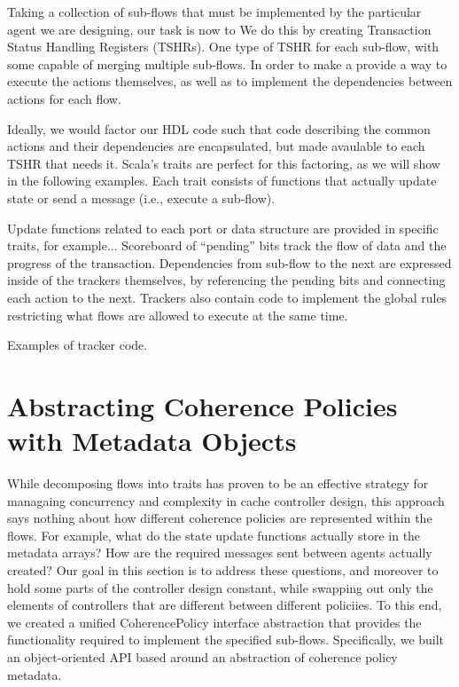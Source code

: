 Taking a collection of sub-flows that must be implemented by the particular agent we are designing,
our task is now to 
We do this by creating Transaction Status Handling Registers (TSHRs).
One type of TSHR for each sub-flow, with some capable of merging multiple sub-flows.
In order to make a
provide a way to execute the actions themselves, as well as to implement the dependencies between actions for each flow.

Ideally, we would factor our HDL code such that code describing the common actions and their dependencies are encapsulated,
but made avaulable to each TSHR that needs it.
Scala's traits are perfect for this factoring, as we will show in the following examples.
Each trait consists of functions that actually update state or send a message (i.e., execute a sub-flow).

Update functions related to each port or data structure are provided in specific traits, for example...
Scoreboard of ``pending'' bits track the flow of data and the progress of the transaction.
Dependencies from sub-flow to the next are expressed inside of the trackers themselves,
by referencing the pending bits and connecting each action to the next.
Trackers also contain code to implement the global rules restricting what flows are allowed to execute at the same time.

Examples of tracker code.


\section{Abstracting Coherence Policies with Metadata Objects}

While decomposing flows into traits has proven to be an effective strategy for managaing concurrency and complexity in cache controller design,
this approach says nothing about how different coherence policies are represented within the flows.
For example, what do the state update functions actually store in the metadata arrays?
How are the required messages sent between agents actually created?
Our goal in this section is to address these questions, and moreover to 
hold some parts of the controller design constant, while swapping out only the
elements of controllers that are different between different policiies.
To this end, we created a unified CoherencePolicy interface abstraction that provides the functionality required to implement the specified sub-flows.
Specifically, we built an object-oriented API based around an abstraction of coherence policy metadata.

